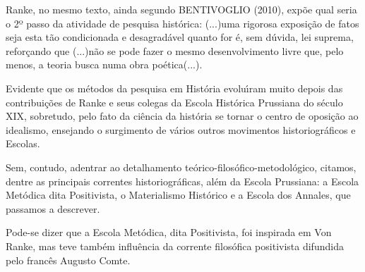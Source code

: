 \documentclass[
12pt,		%
openright,	%
twoside,  %
a4paper,			%
chapter=TITLE,		%
english,			%
french,				%
spanish,			%
brazil				%
]{USPSC-classe/USPSC}
\begin{document}
Ranke, no mesmo texto, ainda segundo  BENTIVOGLIO (2010), exp\~oe qual seria o 2º passo da atividade de pesquisa hist\'orica: \textquotedbl (...)uma rigorosa exposi\c{c}\~ao de fatos seja esta t\~ao condicionada e desagrad\'avel quanto for \'e, sem d\'uvida, lei suprema\textquotedbl , refor\c{c}ando que \textquotedbl (...)n\~ao se pode fazer o mesmo desenvolvimento livre que, pelo menos, a teoria busca numa obra po\'etica(...)\textquotedbl .

















Evidente que os m\'etodos da pesquisa em Hist\'oria evolu\'{\i}ram muito depois das contribui\c{c}\~oes de Ranke e seus colegas da Escola Hist\'orica Prussiana do s\'eculo XIX, sobretudo, pelo fato da ci\^encia  da hist\'oria se tornar o centro de oposi\c{c}\~ao ao idealismo, ensejando o surgimento de v\'arios outros movimentos historiogr\'aficos e Escolas.

















Sem, contudo, adentrar ao detalhamento te\'orico-filos\'ofico-metodol\'ogico, citamos, dentre as principais correntes historiogr\'aficas, al\'em da Escola Prussiana: a Escola Met\'odica dita Positivista, o Materialismo Hist\'orico e a Escola dos Annales, que passamos a descrever.

















Pode-se dizer que a Escola Met\'odica, dita Positivista, foi inspirada em Von Ranke, mas teve tamb\'em influ\^encia da corrente filos\'ofica positivista difundida pelo franc\^es Augusto Comte.
\end{document}
